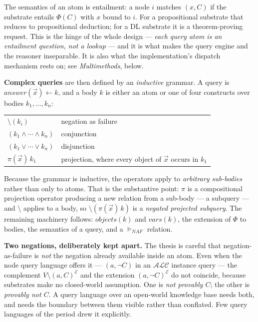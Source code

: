 \documentclass[11pt,a4paper,DIV=12,parskip=half]{scrartcl}
\newenvironment{note}
  {\begin{list}{}{\setlength{\leftmargin}{1.5em}\setlength{\rightmargin}{1.5em}%
                  \setlength{\listparindent}{0pt}}\item[]\small}
  {\end{list}}
\begin{document}
The semantics of an atom is entailment: a node $i$ matches $(x, C)$ if the
substrate entails $\Phi(C)$ with $x$ bound to $i$. For a propositional substrate
that reduces to propositional deduction; for a DL substrate it is a
theorem-proving request. This is the hinge of the whole design --- \emph{each
query atom is an entailment question, not a lookup} --- and it is what makes the
query engine and the reasoner inseparable. It is also what the implementation's
dispatch mechanism rests on; see \emph{Multimethods}, below.

\textbf{Complex queries} are then defined by an \emph{inductive} grammar. A query
is $\mathit{answer}(\vec{x}) \leftarrow k$, and a body $k$ is either an atom or
one of four constructs over bodies $k_1, \ldots, k_n$:

\begin{center}
\small
\begin{tabular}{@{}ll@{}}
\toprule
$\setminus (k_i)$ & negation as failure \\
$(k_1 \wedge \cdots \wedge k_n)$ & conjunction \\
$(k_1 \vee \cdots \vee k_n)$ & disjunction \\
$\pi(\vec{x})\, k_1$ & projection, where every object of $\vec{x}$ occurs in $k_1$ \\
\bottomrule
\end{tabular}
\end{center}

Because the grammar is inductive, the operators apply to \emph{arbitrary
sub-bodies} rather than only to atoms. That is the substantive point: $\pi$ is a
compositional projection operator producing a new relation from a sub-body --- a
subquery --- and $\setminus$ applies to a body, so $\setminus(\pi(\vec{x})\,k)$
is a \emph{negated projected subquery}. The remaining machinery follows:
$\mathit{objects}(k)$ and $\mathit{vars}(k)$, the extension of $\Phi$ to bodies,
the semantics of a query, and a $\models_{NAF}$ relation.

\begin{note}
\textbf{Two negations, deliberately kept apart.} The thesis is careful that
negation-as-failure is \emph{not} the negation already available inside an atom.
Even when the node query language offers it --- $(a, \neg C)$ in an
$\mathcal{ALC}$ instance query --- the complement $V \setminus (a,C)^\mathcal{E}$
and the extension $(a, \neg C)^\mathcal{E}$ do not coincide, because substrates
make no closed-world assumption. One is \emph{not provably $C$}; the other is
\emph{provably not $C$}. A query language over an open-world knowledge base needs
both, and needs the boundary between them visible rather than conflated. Few
query languages of the period drew it explicitly.
\end{note}
\end{document}

